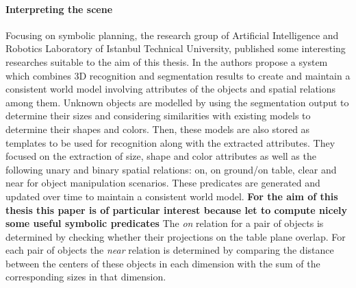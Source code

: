 \paragraph{Interpreting the scene}
Focusing on symbolic planning, the research group of Artificial Intelligence and Robotics Laboratory of
Istanbul Technical University, published some interesting researches suitable to the aim of this thesis. In \citep{ersen2014scene} \citep{SSS147762} \citep{ersen2013extracting} the authors propose a system which combines 3D recognition and segmentation results to create and maintain a consistent world model involving attributes of the objects and spatial relations among them. Unknown objects are modelled by using the segmentation output to determine their sizes and considering similarities with existing models to determine their shapes and colors. Then, these models are also stored as templates to be used for recognition along with the extracted attributes. 
They focused on the extraction of size, shape and color attributes as well as the following unary and binary spatial relations: on, on ground/on table, clear and near for object manipulation scenarios. These predicates are generated and updated over time to maintain a consistent world model.
\textbf{For the aim of this thesis this paper is of particular interest because let to compute nicely some useful symbolic predicates}
The \textit{on} relation for a pair of objects is determined by checking whether their projections on the table plane overlap. For each pair of objects the \textit{near} relation is determined by comparing the distance between the centers of these objects in each dimension with the sum of the corresponding sizes in that dimension. 



